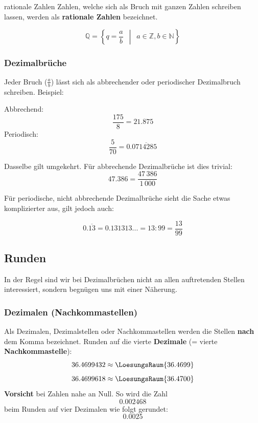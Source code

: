 \begin{definition}{rationale Zahlen}{}
Zahlen, welche sich als Bruch mit ganzen Zahlen schreiben lassen,
werden als \textbf{rationale Zahlen} bezeichnet.


$$\mathbb{Q} =\left\{ q = \frac{a}{b} \,\,\, \middle| \,\,\, a \in \mathbb{Z}, b \in \mathbb{N}\right\}$$
\end{definition}

\subsubsection{Dezimalbrüche}
Jeder Bruch ($\frac{a}{b}$) lässt sich als
abbrechender oder periodischer Dezimalbruch schreiben. Beispiel:

Abbrechend:
$$\frac{175}{8} = 21.875$$
Periodisch:
$$\frac{5}{70} = 0.0\overline{714285}$$

Dasselbe gilt umgekehrt. Für abbrechende Dezimalbrüche ist dies
trivial:
$$47.386 = \frac{47\,386}{1\,000}$$

Für periodische, nicht abbrechende Dezimalbrüche sieht die Sache etwas komplizierter aus,
gilt jedoch auch:

$$0.\overline{13} = 0.131313... = 13: 99 = \frac{13}{99}$$


\newpage


\subsection{Runden}
In der Regel sind wir bei Dezimalbrüchen nicht an allen auftretenden
Stellen interessiert, sondern begnügen uns mit einer Näherung.

\subsubsection{Dezimalen (Nachkommastellen)}
Als Dezimalen, Dezimalstellen oder Nachkommastellen werden die Stellen \textbf{nach} dem Komma bezeichnet.
Runden auf die vierte \textbf{Dezimale} (= vierte \textbf{Nachkommastelle}):
$$ 36.4699432 \approx  \LoesungsRaum{36.4699}$$
$$ 36.4699618 \approx  \LoesungsRaum{36.4700}$$
\textbf{Vorsicht} bei Zahlen nahe an Null. So wird die Zahl
$$0.002468$$ beim Runden auf vier Dezimalen wie folgt gerundet:
$$0.0025$$

